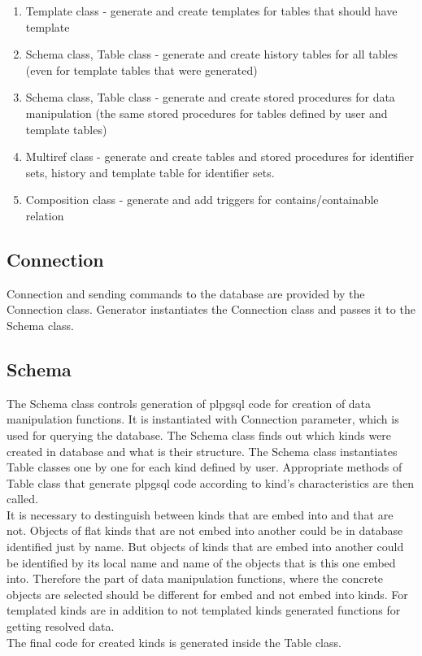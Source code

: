\documentclass[deska]{subfiles}
\begin{document}
\begin{enumerate}
	\item Template class - generate and create templates for tables that should have template
	\item Schema class, Table class - generate and create history tables for all tables (even for template tables that were generated)
	\item Schema class, Table class - generate and create stored procedures for data manipulation (the same stored procedures for tables defined by user and template tables)
	\item Multiref class - generate and create tables and stored procedures for identifier sets, history and template table for identifier sets.
	\item Composition class - generate and add triggers for contains/containable relation
\end{enumerate}

\subsection{Connection}
Connection and sending commands to the database are provided by the Connection class. Generator instantiates the Connection class and passes it to the Schema class.

\subsection{Schema}
The Schema class controls generation of plpgsql code for creation of data manipulation functions. It is instantiated with Connection parameter, which is used for querying the database. 
The Schema class finds out which kinds were created in database and what is their structure. The Schema class instantiates Table classes one by one for each kind defined by user. Appropriate methods of Table class that generate plpgsql code according to kind's characteristics are then called.\\ It is necessary to destinguish between kinds that are embed into and that are not. Objects of flat kinds that are not embed into another could be in database identified just by name. But objects of kinds that are embed into another could be identified by its local name and name of the objects that is this one embed into. Therefore the part of data manipulation functions, where the concrete objects are selected should be different for embed and not embed into kinds.
For templated kinds are in addition to not templated kinds generated functions for getting resolved data.\\
The final code for created kinds is generated inside the Table class.
\end{document}
